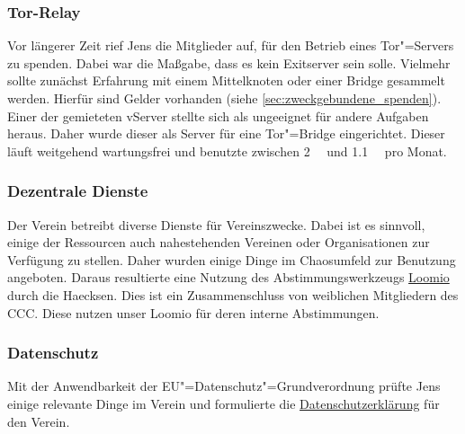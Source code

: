 \documentclass[ngerman]{scrartcl}
\begin{document}
\subsubsection{Tor-Relay}

Vor längerer Zeit rief Jens die Mitglieder auf, für den Betrieb eines
Tor"=Servers zu spenden. Dabei war die Maßgabe, dass es kein Exitserver sein
solle. Vielmehr sollte zunächst Erfahrung mit einem Mittelknoten oder einer
Bridge gesammelt werden. Hierfür sind Gelder vorhanden (siehe
\autoref{sec:zweckgebundene_spenden}). Einer der gemieteten vServer stellte sich
als ungeeignet für andere Aufgaben heraus. Daher wurde dieser als Server für
eine Tor"=Bridge eingerichtet. Dieser läuft weitgehend wartungsfrei und benutzte
zwischen \SI{2}{\gibi\byte} und \SI{1,1}{\tebi\byte} pro Monat.

\subsubsection{Dezentrale Dienste}

Der Verein betreibt diverse Dienste für Vereinszwecke. Dabei ist es sinnvoll,
einige der Ressourcen auch nahestehenden Vereinen oder Organisationen zur
Verfügung zu stellen. Daher wurden einige Dinge im Chaosumfeld zur Benutzung
angeboten. Daraus resultierte eine Nutzung des Abstimmungswerkzeugs
\href{https://loomio.kraut.space/}{Loomio} durch die Haecksen. Dies ist ein
Zusammenschluss von weiblichen Mitgliedern des CCC. Diese nutzen unser Loomio
für deren interne Abstimmungen.

\subsubsection{Datenschutz}

Mit der Anwendbarkeit der EU"=Datenschutz"=Grundverordnung prüfte Jens einige
relevante Dinge im Verein und formulierte die
\href{https://kraut.space/datenschutz}{Datenschutzerklärung} für den Verein.
\end{document}

